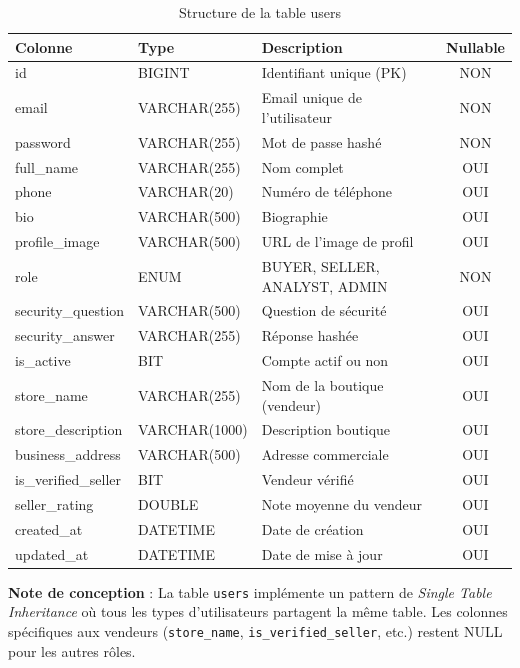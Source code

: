 \documentclass[12pt,a4paper]{report}
\begin{document}
\begin{table}[H]
    \centering
    \caption{Structure de la table users}
    \small
    \begin{tabularx}{\textwidth}{llXc}
        \toprule
        \textbf{Colonne} & \textbf{Type} & \textbf{Description} & \textbf{Nullable} \\
        \midrule
        id & BIGINT & Identifiant unique (PK) & NON \\
        email & VARCHAR(255) & Email unique de l'utilisateur & NON \\
        password & VARCHAR(255) & Mot de passe hashé & NON \\
        full\_name & VARCHAR(255) & Nom complet & OUI \\
        phone & VARCHAR(20) & Numéro de téléphone & OUI \\
        bio & VARCHAR(500) & Biographie & OUI \\
        profile\_image & VARCHAR(500) & URL de l'image de profil & OUI \\
        role & ENUM & BUYER, SELLER, ANALYST, ADMIN & NON \\
        security\_question & VARCHAR(500) & Question de sécurité & OUI \\
        security\_answer & VARCHAR(255) & Réponse hashée & OUI \\
        is\_active & BIT & Compte actif ou non & OUI \\
        store\_name & VARCHAR(255) & Nom de la boutique (vendeur) & OUI \\
        store\_description & VARCHAR(1000) & Description boutique & OUI \\
        business\_address & VARCHAR(500) & Adresse commerciale & OUI \\
        is\_verified\_seller & BIT & Vendeur vérifié & OUI \\
        seller\_rating & DOUBLE & Note moyenne du vendeur & OUI \\
        created\_at & DATETIME & Date de création & OUI \\
        updated\_at & DATETIME & Date de mise à jour & OUI \\
        \bottomrule
    \end{tabularx}
    \label{tab:users}
\end{table}

\textbf{Note de conception} : La table \texttt{users} implémente un pattern de \textit{Single Table Inheritance} où tous les types d'utilisateurs partagent la même table. Les colonnes spécifiques aux vendeurs (\texttt{store\_name}, \texttt{is\_verified\_seller}, etc.) restent NULL pour les autres rôles.
\end{document}
